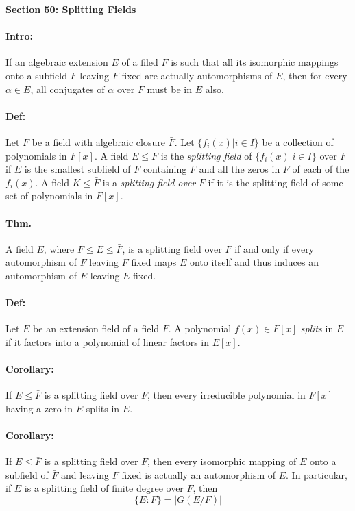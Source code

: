 \documentclass[10pt,a4paper]{article}
\begin{document}
\begin{center}
\textbf{Section 50: Splitting Fields}
\end{center}

\paragraph{Intro:} If an algebraic extension $E$ of a filed $F$ is such that all its isomorphic mappings onto a subfield $\bar{F}$ leaving $F$ fixed are actually automorphisms of $E$, then for every $\alpha \in E$, all conjugates of $\alpha$ over $F$ must be in $E$ also.

\paragraph{Def:} Let $F$ be a field with algebraic closure $\bar{F}$. Let $\{ f_i(x) | i \in I \}$ be a collection of polynomials in $F[x]$. A field $E \leq \bar{F}$ is the \textit{splitting field} of $\{ f_i(x) | i \in I \}$ over $F$ if $E$ is the smallest subfield of $\bar{F}$ containing $F$ and all the zeros in $\bar{F}$ of each of the $f_i(x)$. A field $K \leq \bar{F}$ is a \textit{splitting field over} $F$ if it is the splitting field of some set of polynomials in $F[x]$.

\paragraph{Thm.} A field $E$, where $F \leq E \leq \bar{F}$, is a splitting field over $F$ if and only if every automorphism of $\bar{F}$ leaving $F$ fixed maps $E$ onto itself and thus induces an automorphism of $E$ leaving $E$ fixed.

\paragraph{Def:} Let $E$ be an extension field of a field $F$. A polynomial $f(x) \in F[x]$ \textit{splits} in $E$ if it factors into a polynomial of linear factors in $E[x]$.

\paragraph{Corollary:} If $E \leq \bar{F}$ is a splitting field over $F$, then every irreducible polynomial in $F[x]$ having a zero in $E$ splits in $E$.

\paragraph{Corollary:} If $E \leq \bar{F}$ is a splitting field over $F$, then every isomorphic mapping of $E$ onto a subfield of $\bar{F}$ and leaving $F$ fixed is actually an automorphism of $E$. In particular, if $E$ is a splitting field of finite degree over $F$, then
$$ \{E:F\} = |G(E/F)|$$
\end{document}
